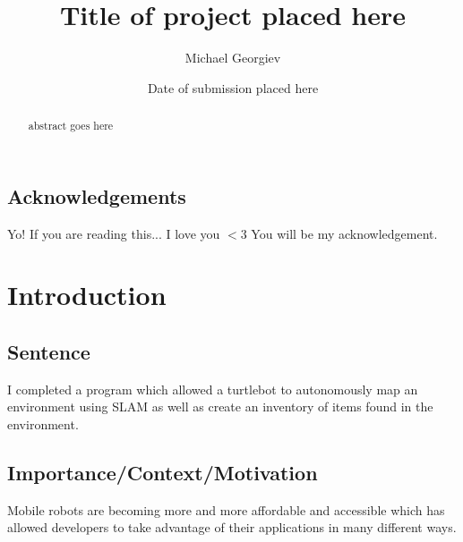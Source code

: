 \documentclass{mproj}
\begin{document}
\title{Title of project placed here}
\author{Michael Georgiev}
\date{Date of submission placed here}
\maketitle

\begin{abstract}
abstract goes here
\end{abstract}

\educationalconsent


\newpage
\section*{Acknowledgements}

Yo! If you are reading this... I love you $<3$ You will be my acknowledgement.

\tableofcontents

\chapter{Introduction}\label{intro}

\section{Sentence}

I completed a program which allowed a turtlebot to autonomously map an environment using SLAM as well as create an inventory of items found in the environment.


\section{Importance/Context/Motivation}

Mobile robots are becoming more and more affordable and accessible which has allowed developers to take advantage of their applications in many different ways. 
\end{document}
